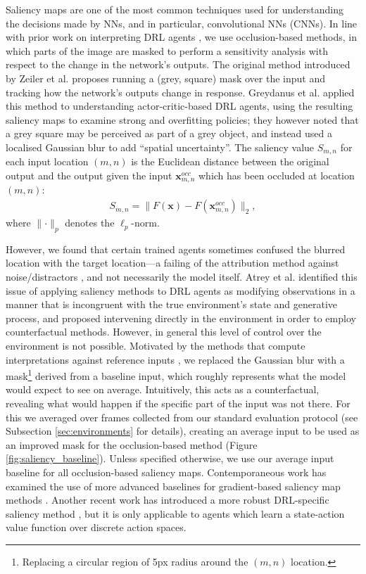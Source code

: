Saliency maps are one of the most common techniques used for
understanding the decisions made by NNs, and in particular,
convolutional NNs (CNNs). In line with prior work on interpreting DRL
agents \cite{greydanus2018visualizing}, we use occlusion-based methods,
in which parts of the image are masked to perform a sensitivity analysis
with respect to the change in the network's outputs. The original method
introduced by Zeiler et al. \cite{zeiler2014visualizing} proposes
running a (grey, square) mask over the input and tracking how the
network's outputs change in response. Greydanus et al.
\cite{greydanus2018visualizing} applied this method to understanding
actor-critic-based DRL agents, using the resulting saliency maps to
examine strong and overfitting policies; they however noted that a grey
square may be perceived as part of a grey object, and instead used a
localised Gaussian blur to add ``spatial uncertainty''. The saliency
value \(S_{m,n}\) for each input location \((m, n)\) is the Euclidean
distance between the original output and the output given the input
\(\mathbf{x}_{m, n}^{occ}\) which has been occluded at location
\((m, n)\): \begin{align}
S_{m, n} = \lVert F(\mathbf{x}) - F(\mathbf{x}_{m, n}^{occ}) \rVert_2,
\end{align} \noindent where \(\lVert\cdot\rVert_p\) denotes the
\(\ell_p\)-norm.

However, we found that certain trained agents sometimes confused the
blurred location with the target location---a failing of the attribution
method against noise/distractors \cite{kindermans2016investigating},
and not necessarily the model itself. {Atrey et al.}
\cite{atrey2020exploratory} {identified this issue of applying saliency methods to DRL agents as modifying observations in a manner that is incongruent with the true environment's state and generative process, and proposed intervening directly in the environment in order to employ counterfactual methods. However, in general this level of control over the environment is not possible.}
Motivated by the methods that compute interpretations against reference
inputs
\cite{bach2015pixel, ribeiro2016should, shrikumar2017learning, sundararajan2017axiomatic},
we replaced the Gaussian blur with a mask\footnote{Replacing a circular
  region of 5px radius around the \((m, n)\) location.} derived from a
baseline input, which roughly represents what the model would expect to
see on average. Intuitively, this acts as a counterfactual, revealing
what would happen if the specific part of the input was not there. For
this we averaged over frames collected from our standard evaluation
protocol (see Subsection \ref{sec:environments} for details), creating
an average input to be used as an improved mask for the occlusion-based
method (Figure \ref{fig:saliency_baseline}). Unless specified otherwise,
we use our average input baseline for all occlusion-based saliency maps.
Contemporaneous work has examined the use of more advanced baselines for
gradient-based saliency map methods \cite{sturmfels2020visualizing}. {Another recent work has introduced a more robust DRL-specific saliency method}
\cite{puri2020explain}{, but it is only applicable to agents which learn a state-action value function over discrete action spaces.}

